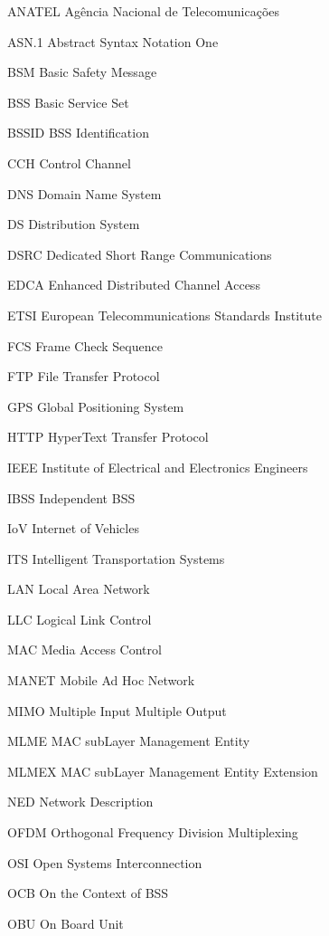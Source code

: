 \documentclass[
12pt,				%
openright,			%
oneside,			%
a4paper,			%
brazil,				%
]{abntex2}
\begin{document}
	\begin{siglas}
		\item[ANATEL] Agência Nacional de Telecomunicações
		\item[ASN.1] Abstract Syntax Notation One
		\item[BSM] Basic Safety Message
		\item[BSS] Basic Service Set
		\item[BSSID] BSS Identification
		\item[CCH] Control Channel
		\item[DNS] Domain Name System
		\item[DS] Distribution System
		\item[DSRC] Dedicated Short Range Communications
		\item[EDCA] Enhanced Distributed Channel Access
		\item[ETSI] European Telecommunications Standards Institute
		\item[FCS] Frame Check Sequence
		\item[FTP] File Transfer Protocol
		\item[GPS] Global Positioning System
		\item[HTTP] HyperText Transfer Protocol
		\item[IEEE] Institute of Electrical and Electronics Engineers
		\item[IBSS] Independent BSS 
		\item[IoV] Internet of Vehicles
		\item[ITS] Intelligent Transportation Systems 
		\item[LAN] Local Area Network
		\item[LLC] Logical Link Control
		\item[MAC] Media Access Control
		\item[MANET] Mobile Ad Hoc Network
		\item[MIMO] Multiple Input Multiple Output
		\item[MLME] MAC subLayer Management Entity
		\item[MLMEX] MAC subLayer Management Entity Extension
		\item[NED] Network Description
		\item[OFDM] Orthogonal Frequency Division Multiplexing
		\item[OSI] Open Systems Interconnection 
		\item[OCB] On the Context of BSS
		\item[OBU] On Board Unit

\end{siglas}
\end{document}
